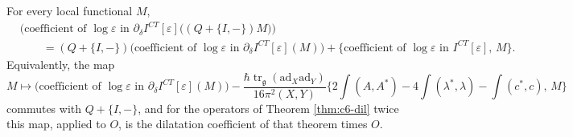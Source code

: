 \begin{theorem}
\label{thm:c10-brst}
For every local functional $M$,
\begin{equation}
\begin{aligned}
&\big(\text{coefficient of }\log\varepsilon\text{ in }\partial_\delta I^{CT}[\varepsilon]\big((Q+\{I,-\})M\big)\big)\\
&\qquad=(Q+\{I,-\})\big(\text{coefficient of }\log\varepsilon\text{ in }\partial_\delta I^{CT}[\varepsilon](M)\big)+\big\{\text{coefficient of }\log\varepsilon\text{ in }I^{CT}[\varepsilon],\,M\big\}.
\end{aligned}
\label{eq:c10-brst}
\end{equation}
Equivalently, the map
\[
M\longmapsto\big(\text{coefficient of }\log\varepsilon\text{ in }\partial_\delta I^{CT}[\varepsilon](M)\big)-\frac{\hbar\operatorname{tr}_{\mathfrak g}(\mathrm{ad}_X\mathrm{ad}_Y)}{16\pi^2(X,Y)}\Big\{2\int(A,A^*)-4\int(\lambda^*,\lambda)-\int(c^*,c),\,M\Big\}
\]
commutes with $Q+\{I,-\}$, and for the operators of Theorem \ref{thm:c6-dil} twice this map, applied to $O$, is the dilatation coefficient of that theorem times $O$.
\end{theorem}


